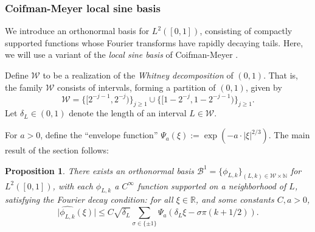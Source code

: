 \documentclass[conference]{IEEEtran}
\def\R{\mathbb{R}}
\newtheorem{proposition}[theorem]{Proposition}
\numberwithin{equation}{section}
\newcommand{\AM}[1]{{\color{purple}AM: #1}}
\newcommand{\N}{\mathbb N}
\newcommand{\cW}{\mathcal W}
\newcommand{\cB}{\mathcal B}
\def\R{\mathbb{R}}
\begin{document}
\subsubsection{Coifman-Meyer local sine basis}

We introduce an orthonormal basis for $L^2([0,1])$, consisting of compactly supported functions whose Fourier transforms have rapidly decaying tails. Here, we will use a variant of the \emph{local sine basis} of Coifman-Meyer \cite{CM}.
 



 
Define $\cW$ to be a realization of the \emph{Whitney decomposition} of $(0,1)$. That is, the family $\cW$ consists of intervals, forming a partition of $(0,1)$, given by
\[
\cW =  \{ [ 2^{-j-1}, 2^{-j} ) \}_{j \geq 1} \cup  \{ [ 1 - 2^{-j}, 1 - 2^{-j-1})\}_{j \geq 1}.
\]
Let $\delta_L \in (0,1)$ denote the length of an interval $L \in \cW$. 
% 

For $a>0$, define the ``envelope  function'' $\Psi_a(\xi) := \exp (- a \cdot \lvert \xi \rvert^{2/3})$. The main result of the section follows: 

\begin{proposition}\label{basis:prop}
There exists an orthonormal basis $\cB^1 = \{ \phi_{L,k} \}_{(L,k) \in \cW \times \N}$ for $L^2([0,1])$, with each $\phi_{L,k}$  a  $C^\infty$ function supported on a neighborhood of $L$, satisfying the Fourier decay condition: for all $\xi \in \R$, and some constants $C,a > 0$,
\begin{equation}
\label{Fourier_decay_CM:eqn}
\lvert \widehat{\phi_{L,k}} (\xi) \rvert \leq C \sqrt{\delta_L}  \sum_{\sigma \in \{\pm 1\}} \Psi_a\left( \delta_L  \xi -  \sigma  \pi (k+ 1/2) \right).
\end{equation}
\end{proposition}

\end{document}
